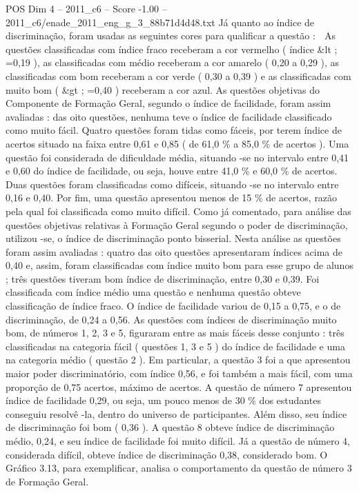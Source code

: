 \begin{textsample}{POS Dim 4 – 2011\_c6 – Score -1.00 – 2011\_c6/enade\_2011\_eng\_g\_3\_88b71d4d48.txt}
Já quanto ao índice de discriminação, foram usadas as seguintes cores para qualificar a questão :  As questões classificadas com índice fraco receberam a cor vermelho ( índice \&lt ; =0,19 ), as classificadas com médio receberam a cor amarelo ( 0,20 a 0,29 ), as classificadas com bom receberam a cor verde ( 0,30 a 0,39 ) e as classificadas com muito bom ( \&gt ; =0,40 ) receberam a cor azul.
As questões objetivas do Componente de Formação Geral, segundo o índice de facilidade, foram assim avaliadas : das oito questões, nenhuma teve o índice de facilidade classificado como muito fácil.
Quatro questões foram tidas como fáceis, por terem índice de acertos situado na faixa entre 0,61 e 0,85 ( de 61,0 \% a 85,0 \% de acertos ).
Uma questão foi considerada de dificuldade média, situando -se no intervalo entre 0,41 e 0,60 do índice de facilidade, ou seja, houve entre 41,0 \% e 60,0 \% de acertos.
Duas questões foram classificadas como difíceis, situando -se no intervalo entre 0,16 e 0,40.
Por fim, uma questão apresentou menos de 15 \% de acertos, razão pela qual foi classificada como muito difícil.
Como já comentado, para análise das questões objetivas relativas à Formação Geral segundo o poder de discriminação, utilizou -se, o índice de discriminação ponto bisserial.
Nesta análise as questões foram assim avaliadas : quatro das oito questões apresentaram índices acima de 0,40 e, assim, foram classificadas com índice muito bom para esse grupo de alunos ; três questões tiveram bom índice de discriminação, entre 0,30 e 0,39.
Foi classificada com índice médio uma questão e nenhuma questão obteve classificação de índice fraco.
O índice de facilidade variou de 0,15 a 0,75, e o de discriminação, de 0,24 a 0,56.
As questões com índices de discriminação muito bom, de números 1, 2, 3 e 5, figuraram entre as mais fáceis desse conjunto : três classificadas na categoria fácil ( questões 1, 3 e 5 ) do índice de facilidade e uma na categoria médio ( questão 2 ).
Em particular, a questão 3 foi a que apresentou maior poder discriminatório, com índice 0,56, e foi também a mais fácil, com uma proporção de 0,75 acertos, máximo de acertos.
A questão de número 7 apresentou índice de facilidade 0,29, ou seja, um pouco menos de 30 \% dos estudantes conseguiu resolvê -la, dentro do universo de participantes.
Além disso, seu índice de discriminação foi bom ( 0,36 ).
A questão 8 obteve índice de discriminação médio, 0,24, e seu índice de facilidade foi muito difícil.
Já a questão de número 4, considerada difícil, obteve índice de discriminação 0,38, considerado bom.
O Gráfico 3.13, para exemplificar, analisa o comportamento da questão de número 3 de Formação Geral.

\end{textsample}
